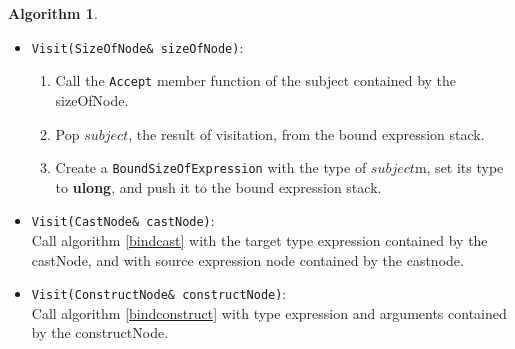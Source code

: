 \documentclass[a4paper,oneside,11pt]{book}
\theoremstyle{definition}
\newtheorem{algo}{Algorithm}[section]
\begin{document}
\begin{algo}
\begin{itemize}
\begin{enumerate}
Let $typeExpr$ be the right side of \textbf{as}-expression contained by asNode.
\item
Call the \verb|Accept| member function of $expr$.
\item
Pop $boundExpr$, the result of visitation, from the bound expression stack.
\item
Let $exprType$ be type of $boundExpr$.
\item
If $exprType$ is not 'pointer to class type', report error and exit.
\item
Otherwise, let $exprClassType$ be the base type of $exprType$.
\item
If $exprClassType$ is not virtual (\ref{virtualclass}), report error and exit.
\item
Otherwise, resolve type of $typeExpr$ using algorithm \ref{resolvetype}. Let $type$ be the type resolved.
\item
If $type$ is not 'pointer to class type', report error and exit.
\item
Otherwise, let $rightClassType$ be the base type of $type$.
\item
If $rightClassType$ is not virtual (\ref{virtualclass}), report error and exit.
\item
Otherwise, create a \verb|BoundAsExpression| with $boundExpr$, $exprClassType$ and $rightClassType$, set its type to $type$,
and push it to the bound expression stack.
\end{enumerate}
\item
\verb|Visit(SizeOfNode& sizeOfNode)|:\\
\begin{enumerate}
\item
Call the \verb|Accept| member function of the subject contained by the sizeOfNode.
\item
Pop $subject$, the result of visitation, from the bound expression stack.
\item
Create a \verb|BoundSizeOfExpression| with the type of $subject$m, set its type to \textbf{ulong}, and push it to the bound expression stack.
\end{enumerate}
\item
\verb|Visit(CastNode& castNode)|:\\
Call algorithm \ref{bindcast} with the target type expression contained by the castNode, and with source expression node contained by the castnode.
\item
\verb|Visit(ConstructNode& constructNode)|:\\
Call algorithm \ref{bindconstruct} with type expression and arguments contained by the constructNode.

\end{itemize}
\end{algo}
\end{document}

